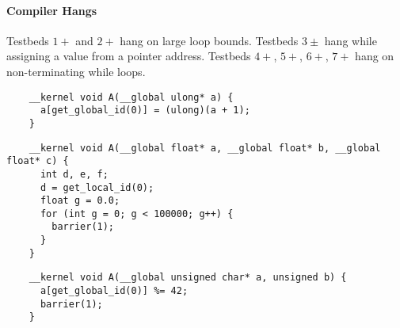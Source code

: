 \paragraph{Compiler Hangs}
Testbeds $1+$ and $2+$ hang on large loop bounds. Testbeds $3\pm$ hang while assigning a value from a pointer address. Testbeds $4+$, $5+$, $6+$, $7+$ hang on non-terminating while loops.

\newsavebox{\IntelPtrCompilerHang}
\begin{lrbox}{\IntelPtrCompilerHang}
  \hspace{1.5em}
  \begin{lstlisting}
    __kernel void A(__global ulong* a) {
      a[get_global_id(0)] = (ulong)(a + 1);
    }
  \end{lstlisting}
\end{lrbox}


\newsavebox{\IntelOptCompilerHang}
\begin{lrbox}{\IntelOptCompilerHang}
  \hspace{1.5em}
  \begin{lstlisting}
    __kernel void A(__global float* a, __global float* b, __global float* c) {
      int d, e, f;
      d = get_local_id(0);
      float g = 0.0;
      for (int g = 0; g < 100000; g++) {
        barrier(1);
      }
    }
  \end{lstlisting}
\end{lrbox}

\newsavebox{\XeonPhiSpin}
\begin{lrbox}{\XeonPhiSpin}
  \hspace{1.5em}
  \begin{lstlisting}
    __kernel void A(__global unsigned char* a, unsigned b) {
      a[get_global_id(0)] %= 42;
      barrier(1);
    }
  \end{lstlisting}
\end{lrbox}

